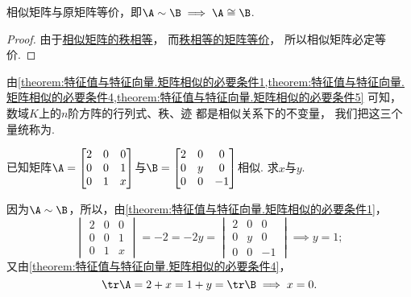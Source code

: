 \begin{property}
相似矩阵与原矩阵等价，即\(\A\sim\B \implies \A\cong\B\).
\begin{proof}
由于\hyperref[theorem:特征值与特征向量.矩阵相似的必要条件5]{相似矩阵的秩相等}，
而\hyperref[theorem:矩阵乘积的秩.矩阵等价的充分必要条件]{秩相等的矩阵等价}，
所以相似矩阵必定等价.
\end{proof}
\end{property}

\begin{remark}
由\cref{theorem:特征值与特征向量.矩阵相似的必要条件1,theorem:特征值与特征向量.矩阵相似的必要条件4,theorem:特征值与特征向量.矩阵相似的必要条件5} 可知，
数域\(K\)上的\(n\)阶方阵的行列式、秩、迹
都是相似关系下的不变量，
我们把这三个量统称为.
\end{remark}

\begin{example}
已知矩阵\(\A = \begin{bmatrix}
	2 & 0 & 0 \\
	0 & 0 & 1 \\
	0 & 1 & x
\end{bmatrix}\)与\(\B = \begin{bmatrix}
	2 & 0 & 0 \\
	0 & y & 0 \\
	0 & 0 & -1
\end{bmatrix}\)相似.
求\(x\)与\(y\).
\begin{solution}
因为\(\A\sim\B\)，所以，由\cref{theorem:特征值与特征向量.矩阵相似的必要条件1}，
\[
	\begin{vmatrix}
		2 & 0 & 0 \\
		0 & 0 & 1 \\
		0 & 1 & x
	\end{vmatrix}
	= -2 = -2y =
	\begin{vmatrix}
		2 & 0 & 0 \\
		0 & y & 0 \\
		0 & 0 & -1
	\end{vmatrix}
	\implies y = 1;
\]
又由\cref{theorem:特征值与特征向量.矩阵相似的必要条件4}，
\[
	\tr\A = 2+x
	= 1+y = \tr\B
	\implies
	x = 0.
\]
\end{solution}
\end{example}
